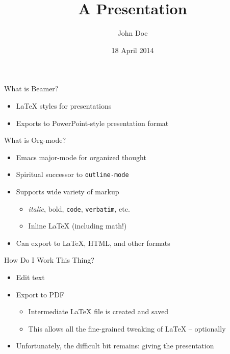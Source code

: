 \documentclass[presentation]{beamer}
\author{John Doe}
\date{18 April 2014}
\title{A Presentation}
\begin{document}
\maketitle

\begin{frame}[label=sec-1]{What is Beamer?}
  \begin{itemize}
  \item \LaTeX{} styles for presentations
  \item Exports to PowerPoint-style presentation format
  \end{itemize}
\end{frame}

\begin{frame}[fragile,label=sec-2]{What is Org-mode?}
  \begin{itemize}
  \item Emacs major-mode for organized thought
  \item Spiritual successor to \texttt{outline-mode}
  \item Supports wide variety of markup
    \begin{itemize}
    \item \emph{italic}, \alert{bold}, \texttt{code}, \verb~verbatim~, etc.
    \item Inline \LaTeX{} (including math!)
    \end{itemize}
  \item Can export to \LaTeX{}, HTML, and other formats
  \end{itemize}
\end{frame}

\begin{frame}[label=sec-3]{How Do I Work This Thing?}
  \begin{itemize}
  \item Edit text
  \item Export to PDF
    \begin{itemize}
    \item Intermediate \LaTeX{} file is created and saved
    \item This allows all the fine-grained tweaking of \LaTeX{} -- optionally
    \end{itemize}
  \item Unfortunately, the difficult bit remains: giving the presentation
  \end{itemize}
\end{frame}
\end{document}
